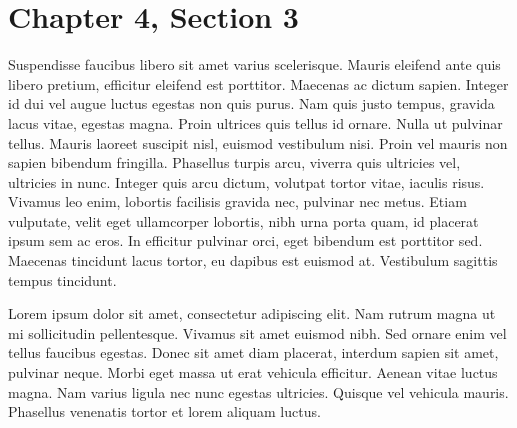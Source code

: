 \section{Chapter 4, Section 3}

Suspendisse faucibus libero sit amet varius scelerisque. Mauris eleifend ante quis libero pretium, efficitur eleifend est porttitor. Maecenas ac dictum sapien. Integer id dui vel augue luctus egestas non quis purus. Nam quis justo tempus, gravida lacus vitae, egestas magna. Proin ultrices quis tellus id ornare. Nulla ut pulvinar tellus. Mauris laoreet suscipit nisl, euismod vestibulum nisi. Proin vel mauris non sapien bibendum fringilla. Phasellus turpis arcu, viverra quis ultricies vel, ultricies in nunc. Integer quis arcu dictum, volutpat tortor vitae, iaculis risus. Vivamus leo enim, lobortis facilisis gravida nec, pulvinar nec metus. Etiam vulputate, velit eget ullamcorper lobortis, nibh urna porta quam, id placerat ipsum sem ac eros. In efficitur pulvinar orci, eget bibendum est porttitor sed. Maecenas tincidunt lacus tortor, eu dapibus est euismod at. Vestibulum sagittis tempus tincidunt. 

Lorem ipsum dolor sit amet, consectetur adipiscing elit. Nam rutrum magna ut mi sollicitudin pellentesque. Vivamus sit amet euismod nibh. Sed ornare enim vel tellus faucibus egestas. Donec sit amet diam placerat, interdum sapien sit amet, pulvinar neque. Morbi eget massa ut erat vehicula efficitur. Aenean vitae luctus magna. Nam varius ligula nec nunc egestas ultricies. Quisque vel vehicula mauris. Phasellus venenatis tortor et lorem aliquam luctus.